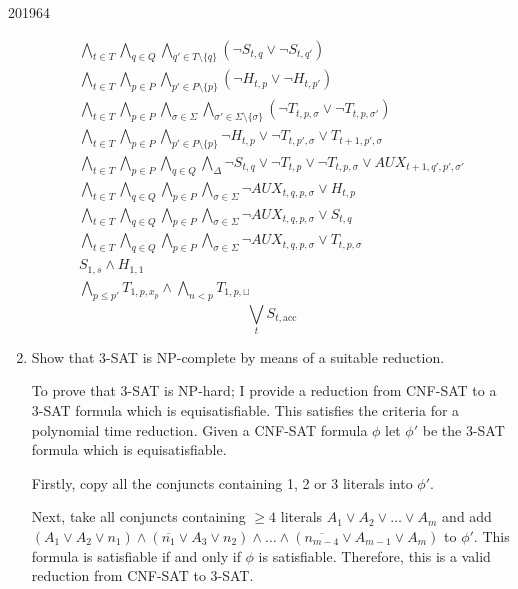 \documentclass[10pt,\jkfside,a4paper]{article}
\begin{document}
\begin{examquestion}{2019}{6}{4}
\begin{enumerate}[label=(\alph*)]
\begin{gather*}
\bigwedge_{t \in T} \bigwedge_{q \in Q} \bigwedge_{q' \in T
\setminus \{q\}} \left(\neg S_{t, q} \vee \neg S_{t, q'}\right)\\
\bigwedge_{t \in T} \bigwedge_{p \in P} \bigwedge_{p' \in P
\setminus \{p\}} \left( \neg H_{t, p} \vee \neg H_{t, p'} \right) \\
\bigwedge_{t \in T} \bigwedge_{p \in P} \bigwedge_{\sigma \in \Sigma}
\bigwedge_{\sigma' \in \Sigma \setminus \{\sigma\}}
\left(\neg T_{t, p, \sigma} \vee \neg T_{t, p, \sigma'}\right)\\
\bigwedge_{t \in T} \bigwedge_{p \in P} \bigwedge_{p' \in P\setminus\{p\}}
\neg H_{t, p} \vee \neg T_{t, p', \sigma} \vee T_{t + 1, p', \sigma}\\
\bigwedge_{t \in T} \bigwedge_{p \in P} \bigwedge_{q \in Q}
\bigwedge_{\Delta}
\neg S_{t, q} \vee \neg T_{t, p} \vee \neg T_{t, p, \sigma} \vee
AUX_{t+1, q', p', \sigma'} \\
\bigwedge_{t \in T} \bigwedge_{q \in Q} \bigwedge_{p \in P} \bigwedge_{\sigma \in \Sigma}
\neg AUX_{t, q, p, \sigma} \vee H_{t, p}\\
\bigwedge_{t \in T} \bigwedge_{q \in Q} \bigwedge_{p \in P} \bigwedge_{\sigma \in \Sigma}
\neg AUX_{t, q, p, \sigma} \vee S_{t, q}\\
\bigwedge_{t \in T} \bigwedge_{q \in Q} \bigwedge_{p \in P} \bigwedge_{\sigma \in \Sigma}
\neg AUX_{t, q, p, \sigma} \vee T_{t, p, \sigma}\\
S_{1, s} \wedge H_{1, 1}\\
\bigwedge_{p \le p'} T_{1, p, x_p} \wedge \bigwedge_{n < p} T_{1, p, \sqcup}
\end{gather*}
\[
\bigvee_{t} S_{t, \text{acc}}
\]

\item Show that 3-SAT is NP-complete by means of a suitable reduction.

To prove that 3-SAT is NP-hard; I provide a reduction from CNF-SAT to a 3-SAT
formula which is equisatisfiable. This satisfies the criteria for a
polynomial time reduction. Given a CNF-SAT formula $\phi$ let $\phi'$ be the
3-SAT formula which is equisatisfiable.

Firstly, copy all the conjuncts containing 1, 2 or 3 literals into $\phi'$.

Next, take all conjuncts containing $\ge 4$ literals $A_1 \vee A_2 \vee \dots \vee A_m$
and add $(A_1 \vee A_2 \vee n_1) \wedge (\overline{n_1} \vee A_3 \vee n_2) \wedge \dots \wedge (\overline{n_{m - 4}} \vee A_{m-1} \vee A_{m})$
to $\phi'$. This formula is satisfiable if and only if $\phi$ is satisfiable.
Therefore, this is a valid reduction from CNF-SAT to 3-SAT\@.


\end{enumerate}
\end{examquestion}
\end{document}
